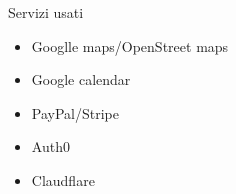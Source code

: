 \documentclass{article}
\begin{document}

\pagebreak

\tableofcontents
\pagebreak










Servizi usati
\begin{itemize}
    \item Googlle maps/OpenStreet maps
    \item Google calendar
    \item PayPal/Stripe
    \item Auth0
    \item Claudflare
\end{itemize}
\end{document}
